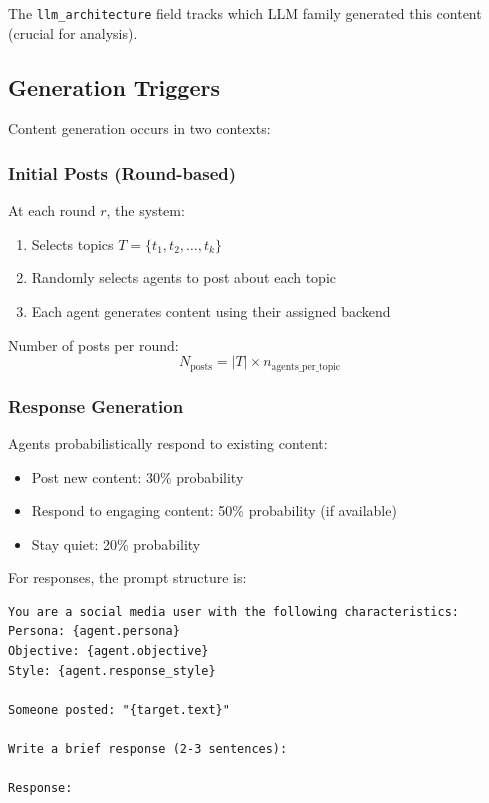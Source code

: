 \documentclass[11pt]{article}
\begin{document}
The \texttt{llm\_architecture} field tracks which LLM family generated this content (crucial for analysis).

\subsection{Generation Triggers}

Content generation occurs in two contexts:

\subsubsection{Initial Posts (Round-based)}

At each round $r$, the system:
\begin{enumerate}
    \item Selects topics $T = \{t_1, t_2, \ldots, t_k\}$
    \item Randomly selects agents to post about each topic
    \item Each agent generates content using their assigned backend
\end{enumerate}

Number of posts per round:
\begin{equation}
N_{\text{posts}} = |T| \times n_{\text{agents\_per\_topic}}
\end{equation}

\subsubsection{Response Generation}

Agents probabilistically respond to existing content:
\begin{itemize}
    \item Post new content: 30\% probability
    \item Respond to engaging content: 50\% probability (if available)
    \item Stay quiet: 20\% probability
\end{itemize}

For responses, the prompt structure is:

\begin{lstlisting}[basicstyle=\small\ttfamily, breaklines=true]
You are a social media user with the following characteristics:
Persona: {agent.persona}
Objective: {agent.objective}
Style: {agent.response_style}

Someone posted: "{target.text}"

Write a brief response (2-3 sentences):

Response:
\end{lstlisting}
\end{document}
